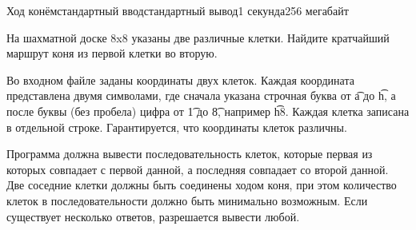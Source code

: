 \begin{problem}{Ход конём}{стандартный ввод}{стандартный вывод}{1 секунда}{256 мегабайт}

На шахматной доске 8x8 указаны две различные клетки. Найдите кратчайший маршрут коня из первой клетки во вторую.

\InputFile
Во входном файле заданы координаты двух клеток. Каждая координата представлена двумя символами, где сначала указана строчная буква от \t{a} до \t{h}, а после буквы (без пробела) цифра от \t{1} до \t{8}, например \t{h8}. Каждая клетка записана в отдельной строке. Гарантируется, что координаты клеток различны.

\OutputFile
Программа должна вывести последовательность клеток, которые первая из которых совпадает с первой данной, а последняя совпадает со второй данной. Две соседние клетки должны быть соединены ходом коня, при этом количество клеток в последовательности должно быть минимально возможным. Если существует несколько ответов, разрешается вывести любой.

\Example

\begin{example}
%
\end{example}

\end{problem}

